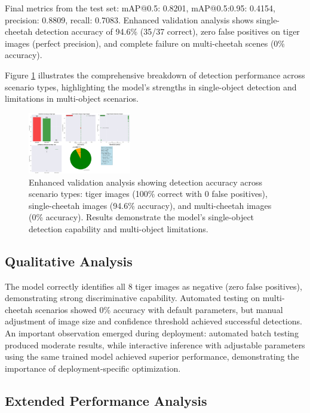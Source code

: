 \documentclass[conference]{IEEEtran}
\begin{document}
Final metrics from the test set: mAP@0.5: 0.8201, mAP@0.5:0.95: 0.4154, precision: 0.8809, recall: 0.7083. Enhanced validation analysis shows single-cheetah detection accuracy of 94.6\% (35/37 correct), zero false positives on tiger images (perfect precision), and complete failure on multi-cheetah scenes (0\% accuracy).

Figure \ref{fig:enhanced_validation} illustrates the comprehensive breakdown of detection performance across scenario types, highlighting the model's strengths in single-object detection and limitations in multi-object scenarios.

\begin{figure}[htbp]
\centerline{\includegraphics[width=0.4\textwidth]{enhanced_validation.png}}
\caption{Enhanced validation analysis showing detection accuracy across scenario types: tiger images (100\% correct with 0 false positives), single-cheetah images (94.6\% accuracy), and multi-cheetah images (0\% accuracy). Results demonstrate the model's single-object detection capability and multi-object limitations.}
\label{fig:enhanced_validation}
\end{figure}

\subsection{Qualitative Analysis}

The model correctly identifies all 8 tiger images as negative (zero false positives), demonstrating strong discriminative capability. Automated testing on multi-cheetah scenarios showed 0\% accuracy with default parameters, but manual adjustment of image size and confidence threshold achieved successful detections. An important observation emerged during deployment: automated batch testing produced moderate results, while interactive inference with adjustable parameters using the same trained model achieved superior performance, demonstrating the importance of deployment-specific optimization.

\subsection{Extended Performance Analysis}
\end{document}
